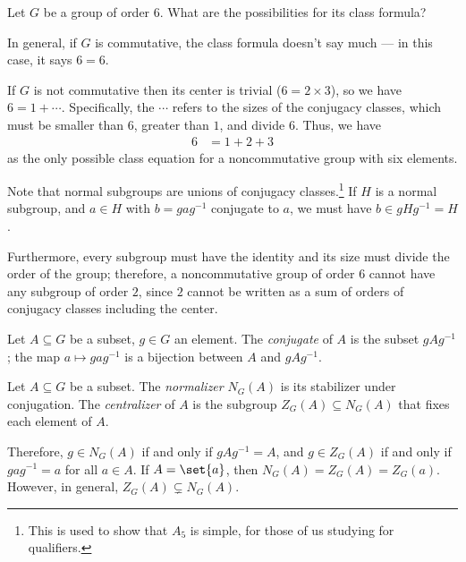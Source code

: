 \documentclass[10pt]{mypackage}
\begin{document}
\begin{example}
  Let $G$ be a group of order $6$. What are the possibilities for its class formula?\newline

  In general, if $G$ is commutative, the class formula doesn't say much --- in this case, it says $6 = 6$.\newline

  If $G$ is not commutative then its center is trivial ($ 6 = 2\times 3 $), so we have $6 = 1 + \cdots$. Specifically, the $\cdots$ refers to the sizes of the conjugacy classes, which must be smaller than $6$, greater than $1$, and divide $6$. Thus, we have
  \begin{align*}
    6 &= 1 + 2 + 3
  \end{align*}
  as the only possible class equation for a noncommutative group with six elements.
\end{example}
Note that normal subgroups are unions of conjugacy classes.\footnote{This is used to show that $A_5$ is simple, for those of us studying for qualifiers.} If $H$ is a normal subgroup, and $a\in H$ with $b = gag^{-1}$ conjugate to $a$, we must have $b\in gHg^{-1} = H$.\newline

Furthermore, every subgroup must have the identity and its size must divide the order of the group; therefore, a noncommutative group of order $6$ cannot have any subgroup of order $2$, since $2$ cannot be written as a sum of orders of conjugacy classes including the center.
\begin{definition}
  Let $A\subseteq G$ be a subset, $g\in G$ an element. The \textit{conjugate} of $A$ is the subset $gAg^{-1}$; the map $a\mapsto gag^{-1}$ is a bijection between $A$ and $gAg^{-1}$.
\end{definition}
\begin{definition}
  Let $A\subseteq G$ be a subset. The \textit{normalizer} $N_G(A)$ is its stabilizer under conjugation. The \textit{centralizer} of $A$ is the subgroup $Z_G(A)\subseteq N_G(A)$ that fixes each element of $A$.
\end{definition}
Therefore, $g\in N_G(A)$ if and only if $gAg^{-1} = A$, and $g\in Z_G(A)$ if and only if $gag^{-1} = a$ for all $a\in A$. If $A = \set{a}$, then $N_G(A) = Z_G(A) = Z_G(a)$. However, in general, $Z_G(A)\subsetneq N_G(A)$.\newline
\end{document}
